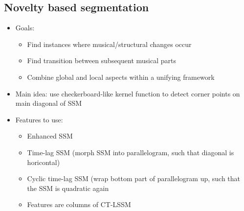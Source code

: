\subsection{Novelty based segmentation}
\begin{itemize}
	\item
		Goals:
		\begin{itemize}
			\item
				Find instances where musical/structural changes occur
			\item
				Find transition between subsequent musical parts
			\item
				Combine global and local aspects within a unifying framework
		\end{itemize}
	\item
		Main idea: use checkerboard-like kernel function to detect corner points on main diagonal of SSM
	\item
		Features to use:
		\begin{itemize}
			\item
				Enhanced SSM
			\item
				Time-lag SSM (morph SSM into parallelogram, such that diagonal is horicontal)
			\item
				Cyclic time-lag SSM (wrap bottom part of parallelogram up, such that the SSM is quadratic again
			\item
				Features are columns of CT-LSSM
		\end{itemize}
\end{itemize}

